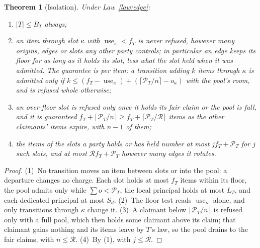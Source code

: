 \documentclass[journal]{IEEEtran}
\newtheorem{theorem}{Theorem}
\newcommand{\Rg}{\mathcal{R}}
\newcommand{\Pool}{\mathcal{P}}
\newcommand{\use}{\operatorname{use}}
\begin{document}
\begin{theorem}[Isolation]\label{theorem:isolation}
Under Law~\ref{law:edge}:
\begin{enumerate}[leftmargin=1.5em]
\item $|T|\le B_T$ always;
\item an item through slot $\kappa$ with $\use_\kappa<f_T$ is never refused, however many
origins, edges or slots any other party controls; in particular an edge keeps its floor for as
long as it holds its slot, less what the slot held when it was admitted.  The guarantee is per
item: a transition adding $k$ items through $\kappa$ is admitted only if
$k\le(f_T-\use_\kappa)+(\lceil\Pool_T/n\rceil-o_\kappa)$ with the pool's room, and is refused
whole otherwise;
\item an over-floor slot is refused only once it holds its fair claim or the pool is full, and
it is guaranteed $f_T+\lceil\Pool_T/n\rceil\ge f_T+\lceil\Pool_T/\Rg\rceil$ items as the other
claimants' items expire, with $n-1$ of them;
\item the items of the slots a party holds or has held number at most $j f_T+\Pool_T$ for $j$
such slots, and at most $\Rg f_T+\Pool_T$ however many edges it rotates.
\end{enumerate}
\end{theorem}
\begin{proof}
(1)~No transition moves an item between slots or into the pool: a departure changes no charge.
Each slot holds at most $f_T$ items within its floor, the pool admits only while $\sum o<\Pool_T$,
the local principal holds at most $L_T$, and each dedicated principal at most $S_d$.
(2)~The floor test reads $\use_\kappa$ alone, and only transitions through $\kappa$ change it.
(3)~A claimant below $\lceil\Pool_T/n\rceil$ is refused only with a full pool, which then holds
some claimant above its claim; that claimant gains nothing and its items leave by $T$'s law, so
the pool drains to the fair claims, with $n\le\Rg$.
(4)~By (1), with $j\le\Rg$.
\end{proof}
\end{document}
